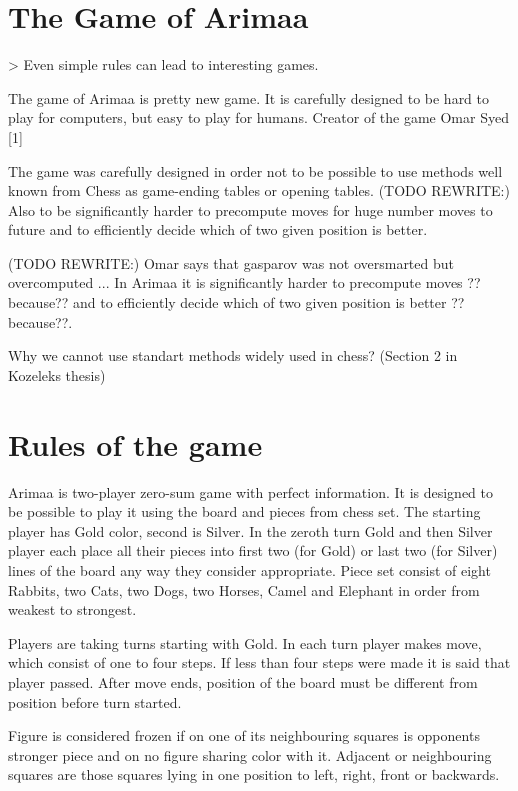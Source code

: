 \section{The Game of Arimaa}
> Even simple rules can lead to interesting games.


The game of Arimaa is pretty new game. It is carefully designed to be hard to
play for computers, but easy to play for humans. Creator of the game Omar
Syed [1]

The game was carefully designed in order not to be possible to use methods
well known from Chess as game-ending tables or opening tables. (TODO
REWRITE:) Also to be significantly harder to precompute moves for huge
number moves to future and to efficiently decide which of two given position
is better.

(TODO REWRITE:) Omar says that gasparov was not oversmarted but overcomputed ...
In Arimaa it is significantly harder to precompute moves ??because?? and to
efficiently decide which of two given position is better ??because??.

Why we cannot use standart methods widely used in chess? (Section 2 in Kozeleks thesis)

\section{Rules of the game~\cite{arimaa.com}}
Arimaa is two-player zero-sum game with perfect information. It is designed to
be possible to play it using the board and pieces from chess set. The starting
player has Gold color, second is Silver. In the zeroth turn Gold and then
Silver player each place all their pieces into first two (for Gold) or last two
(for Silver) lines of the board any way they consider appropriate. Piece set
consist of eight Rabbits, two Cats, two Dogs, two Horses, Camel and Elephant in
order from weakest to strongest.


Players are taking turns starting with Gold. In each turn player makes move,
which consist of one to four steps. If less than four steps were made it is
said that player passed. After move ends, position of the board must be
different from position before turn started.

Figure is considered frozen if on one of its neighbouring squares is opponents
stronger piece and on no figure sharing color with it. Adjacent or neighbouring
squares are those squares lying in one position to left, right, front or
backwards.

